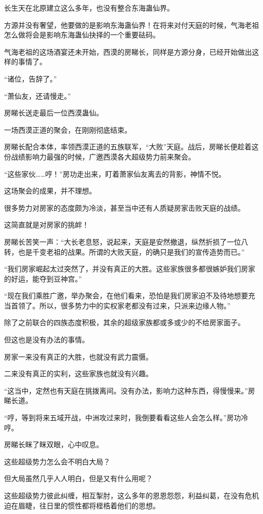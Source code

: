 \begin{this_body}
长生天在北原建立这么多年，也没有整合东海蛊仙界。

方源并没有奢望，他要做的是影响东海蛊仙界！在将来对付天庭的时候，气海老祖怎么做将会是影响东海蛊仙抉择的一个重要砝码。

气海老祖的这场酒宴还未开始，西漠的房睇长，同样是方源分身，已经开始做出这样的事情了。

“诸位，告辞了。”

“萧仙友，还请慢走。”

房睇长送走最后一位西漠蛊仙。

一场西漠正道的聚会，在刚刚彻底结束。

房睇长配合本体，率领西漠正道的五族联军，“大败”天庭。战后，房睇长便趁着这份战绩影响力最强的时候，广邀西漠各大超级势力前来聚会。

“这些家伙……哼！”房功走出来，盯着萧家仙友离去的背影，神情不悦。

这场聚会的成果，并不理想。

很多势力对房家的态度颇为冷淡，甚至当中还有人质疑房家击败天庭的战绩。

这简直就是对房家的挑衅！

房睇长苦笑一声：“大长老息怒，说起来，天庭是安然撤退，纵然折损了一位八转，也是千变老祖的战果。所谓的大败天庭，的确只是我们的宣传造势而已。”

“我们房家崛起太过突然了，并没有真正的大胜。这些家族很多都很嫉妒我们房家的好运，能夺到豆神宫。”

“现在我们乘胜广邀，举办聚会，在他们看来，恐怕是我们房家迫不及待地想要充当首领了。所以，很多势力中的实权家老都没有过来，只派来边缘人物。”

除了之前联合的四族态度积极，其余的超级家族都或多或少的不给房家面子。

但这也是没有办法的事情。

房家一来没有真正的大胜，也就没有武力震慑。

二来没有真正的实利，这些家族也就没有兴趣。

“这当中，定然也有天庭在挑拨离间。没有办法，影响力这种东西，得慢慢来。”房睇长道。

“哼，等到将来五域开战，中洲攻过来时，我倒要看看这些人会怎么样。”房功冷哼。

房睇长眯了眯双眼，心中叹息。

这些超级势力怎么会不明白大局？

但大局虽然几乎人人明白，但是又有什么用呢？

这些超级势力彼此纠缠，相互掣肘，这么多年的恩恩怨怨，利益纠葛，在没有危机迫在眉睫，往日里的惯性都将桎梏着他们的思想。

\end{this_body}

